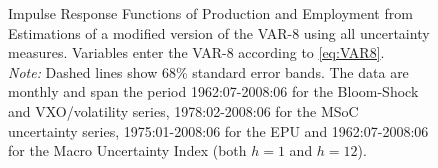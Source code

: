 \documentclass[a4paper,12pt,oneside,pointednumbers,bibtotoc,bigheadings,liststotoc]{scrbook}
\begin{document}
\begin{figure}[!h]
   \centering
   \setlength\fboxsep{0pt}
   \setlength\fboxrule{0pt}
      \caption[Impulse Response Functions of Production and Employment from Estimations of a modified version of the VAR-8 following \citet{bloom:09} using all uncertainty measures.]{Impulse Response Functions of Production and Employment from Estimations of a modified version of the VAR-8 \citet{bloom:09} using all uncertainty measures. Variables enter the VAR-8 according to \ref{eq:VAR8}.\\
       \textit{Note:} Dashed lines show 68\% standard error bands. The data are monthly and span the period 1962:07-2008:06 for the Bloom-Shock and VXO/volatility series, 1978:02-2008:06 for the MSoC uncertainty series, 1975:01-2008:06 for the EPU and 1962:07-2008:06 for the Macro Uncertainty Index (both $h=1$ and $h=12$).}   \label{fig:VAR8_NoHP_until2008}
\end{figure}
\end{document}
